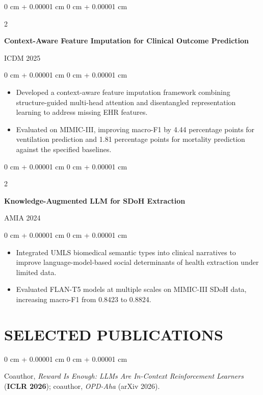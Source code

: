 \documentclass[10pt, letterpaper]{article}
\newenvironment{highlights}{
    \begin{itemize}[
        topsep=0.03 cm,
        parsep=0.03 cm,
        partopsep=0pt,
        itemsep=0pt,
        leftmargin=0 cm + 10pt
    ]
}{
    \end{itemize}
} %
\newenvironment{onecolentry}{
    \begin{adjustwidth}{
        0 cm + 0.00001 cm
    }{
        0 cm + 0.00001 cm
    }
}{
    \end{adjustwidth}
} %
\newenvironment{twocolentry}[2][]{
    \onecolentry
    \def\secondColumn{#2}
    \setcolumnwidth{\fill, 4.5 cm}
    \begin{paracol}{2}
}{
    \switchcolumn \raggedleft \secondColumn
    \end{paracol}
    \endonecolentry
} %
\begin{document}
\begin{twocolentry}{ICDM 2025}
\textbf{Context-Aware Feature Imputation for Clinical Outcome Prediction}
\end{twocolentry}
\begin{onecolentry}
\begin{highlights}
\item Developed a context-aware feature imputation framework combining structure-guided multi-head attention and disentangled representation learning to address missing EHR features.
\item Evaluated on MIMIC-III, improving macro-F1 by 4.44 percentage points for ventilation prediction and 1.81 percentage points for mortality prediction against the specified baselines.
\end{highlights}
\end{onecolentry}
\vspace{0.06 cm}

\begin{twocolentry}{AMIA 2024}
\textbf{Knowledge-Augmented LLM for SDoH Extraction}
\end{twocolentry}
\begin{onecolentry}
\begin{highlights}
\item Integrated UMLS biomedical semantic types into clinical narratives to improve language-model-based social determinants of health extraction under limited data.
\item Evaluated FLAN-T5 models at multiple scales on MIMIC-III SDoH data, increasing macro-F1 from 0.8423 to 0.8824.
\end{highlights}
\end{onecolentry}
\vspace{0.06 cm}
\section{SELECTED PUBLICATIONS}
\begin{onecolentry}
Coauthor, \textit{Reward Is Enough: LLMs Are In-Context Reinforcement Learners} (\textbf{ICLR 2026}); coauthor, \textit{OPD-Aha} (arXiv 2026).
\end{onecolentry}
\end{document}
